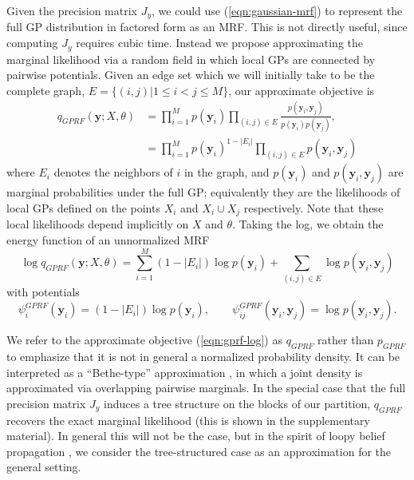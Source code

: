 \documentclass{article}
\renewcommand{\v}[1]{\mathbf{#1}}
\begin{document}
Given the precision matrix $J_y$, we could use
(\ref{eqn:gaussian-mrf}) to represent the full GP distribution in
factored form as an MRF. This is not directly useful, since computing
$J_y$ requires cubic time. Instead we propose approximating the
marginal likelihood via a random field in which local GPs are
connected by pairwise potentials. Given an edge set which we will
initially take to be the complete graph, $E =\{(i,j) | 1\le i < j \le
M\}$, our approximate objective is
\begin{align}
q_{GPRF}(\v{y}; X, \theta)&= \prod_{i=1}^M p(\v{y}_i) 
\prod_{(i,j)\in E} \frac{p(\v{y}_i, \v{y}_j)}{p(\v{y}_i) p(\v{y}_j)},\label{eqn:gprf-naive}\\
&= \prod_{i=1}^M p(\v{y}_i)^{1-|E_i|} \prod_{(i,j)\in E} p(\v{y}_i, \v{y}_j) \nonumber
\end{align}
where $E_i$ denotes the neighbors of $i$ in the graph, and $p(\v{y}_i)$ and $p(\v{y}_{i},
\v{y}_j)$ are marginal probabilities under the full GP;
equivalently they are the likelihoods of local GPs
defined on the points $X_i$ and $X_i \cup X_j$ respectively. Note that
these local likelihoods depend implicitly on $X$ and $\theta$. Taking
the log, we obtain the energy function of an unnormalized MRF
\begin{equation}
\log q_{GPRF}(\v{y}; X, \theta) = \sum_{i=1}^M (1-|E_i|)\log p(\v{y}_i)
 + \sum_{(i,j)\in E} \log p(\v{y}_i, \v{y}_j)  \label{eqn:gprf-log}
\end{equation}
with potentials
\begin{equation}
\psi_i^{GPRF}(\v{y}_i) = (1-|E_i|)\log p(\v{y}_i), \qquad \psi_{ij}^{GPRF}(\v{y}_i, \v{y}_j) =
\log p(\v{y}_i, \v{y}_j).\end{equation}

We refer to the approximate objective (\ref{eqn:gprf-log}) as
$q_{GPRF}$ rather than $p_{GPRF}$ to emphasize that it is not in
general a normalized probability density. It can be interpreted as a
``Bethe-type'' approximation \cite{yedidia2001bethe}, in which a joint
density is approximated via overlapping pairwise marginals. In the
special case that the full precision matrix $J_y$ induces a tree
structure on the blocks of our partition, $q_{GPRF}$ recovers the
exact marginal likelihood (this is shown in the supplementary material). In general this will not be the case, but in the spirit of loopy
belief propagation \cite{murphy1999loopy}, we consider the
tree-structured case as an approximation for the general setting.
\end{document}
